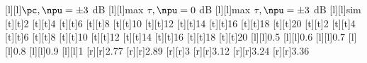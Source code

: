 [l][l]{\fontsize{5.5}{8.25}\selectfont \color[rgb]{0,0,0}$\pc, \npu = \pm 3$ dB}%
[l][l]{\fontsize{5.5}{8.25}\selectfont \color[rgb]{0,0,0}max $\tau, \npu = 0$ dB}%
[l][l]{\fontsize{5.5}{8.25}\selectfont \color[rgb]{0,0,0}max $\tau, \npu = \pm 3$ dB}%
[l][l]{\fontsize{5.5}{8.25}\selectfont \color[rgb]{0,0,0}sim}%
%
\fontsize{5.5}{8.25}%
\selectfont%
%
[t][t]{2}%
[t][t]{4}%
[t][t]{6}%
[t][t]{8}%
[t][t]{10}%
[t][t]{12}%
[t][t]{14}%
[t][t]{16}%
[t][t]{18}%
[t][t]{20}%
[t][t]{2}%
[t][t]{4}%
[t][t]{6}%
[t][t]{8}%
[t][t]{10}%
[t][t]{12}%
[t][t]{14}%
[t][t]{16}%
[t][t]{18}%
[t][t]{20}%
%
[l][l]{0.5}%
[l][l]{0.6}%
[l][l]{0.7}%
[l][l]{0.8}%
[l][l]{0.9}%
[l][l]{1}%
[r][r]{2.77}%
[r][r]{2.89}%
[r][r]{3}%
[r][r]{3.12}%
[r][r]{3.24}%
[r][r]{3.36}%
%
%
